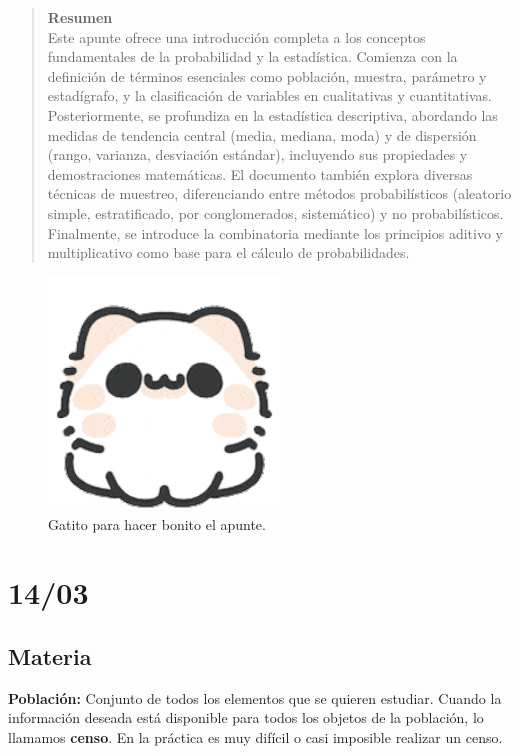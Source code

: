 \documentclass[12pt, letterpaper]{article}
\begin{document}
\begin{abstract}
    \noindent \textbf{Resumen} \\
    Este apunte ofrece una introducción completa a los conceptos fundamentales de la probabilidad y la estadística. Comienza con la definición de términos esenciales como población, muestra, parámetro y estadígrafo, y la clasificación de variables en cualitativas y cuantitativas. Posteriormente, se profundiza en la estadística descriptiva, abordando las medidas de tendencia central (media, mediana, moda) y de dispersión (rango, varianza, desviación estándar), incluyendo sus propiedades y demostraciones matemáticas. El documento también explora diversas técnicas de muestreo, diferenciando entre métodos probabilísticos (aleatorio simple, estratificado, por conglomerados, sistemático) y no probabilísticos. Finalmente, se introduce la combinatoria mediante los principios aditivo y multiplicativo como base para el cálculo de probabilidades.
\end{abstract}

\begin{figure}[htbp]
    \centering
    \includegraphics[width=0.55\textwidth]{gatito}
    \caption{Gatito para hacer bonito el apunte.}
    \label{fig:gatito}
\end{figure}
\newpage

\tableofcontents
\newpage %

\section{14/03}
\subsection{Materia}
\textbf{Población:} %
Conjunto de todos los elementos que se quieren estudiar. Cuando la información deseada está disponible para todos los objetos de la población, lo llamamos \textbf{censo}. En la práctica es muy difícil o casi imposible realizar un censo.
\end{document}
